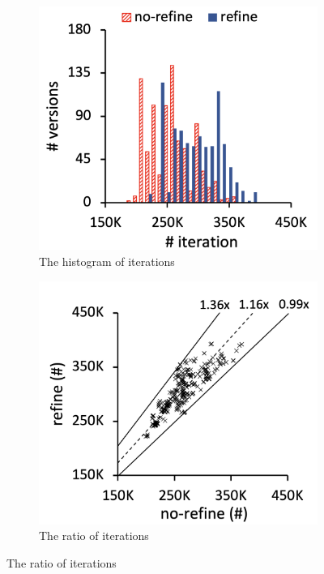 \begin{figure}
  \centering
  \begin{subfigure}[b]{0.24\textwidth}
    \includegraphics[width=\textwidth]{img/compare-iter}
    \caption{The histogram of iterations}
  \end{subfigure}
  \begin{subfigure}[b]{0.24\textwidth}
    \includegraphics[width=\textwidth]{img/ratio-iter}
    \caption{The ratio of iterations}

\end{subfigure}
\end{figure}
